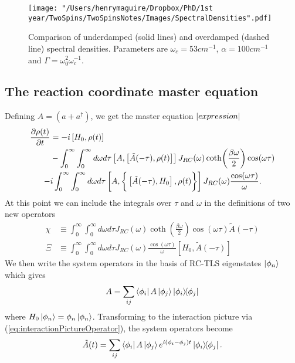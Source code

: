 \documentclass[]{article}
\begin{document}
\begin{figure}
	\texttt{[image: "/Users/henrymaguire/Dropbox/PhD/1st year/TwoSpins/TwoSpinsNotes/Images/SpectralDensities".pdf]}
	\caption{Comparison of underdamped (solid lines) and overdamped (dashed line) spectral densities. Parameters are $\omega_c=53cm^{-1}$, $\alpha=100cm^{-1}$ and $\Gamma=\omega_0^2\omega_c^{-1}$.}
\end{figure}
\subsection{The reaction coordinate master equation}
Defining $A= (a + a^{\dagger})$, we get the master equation $\abs{expression}$
\begin{align}
	\begin{split}
		\label{eq:ReactionMasterExpansion4}
		\pdv{\rho(t)}{t} &= -i\left[H_0, \rho(t)\right]\\
		&-\int_{0}^{\infty}\int_{0}^{\infty}d\omega d\tau 
		\left[A,\left[\tilde{A}(-\tau),\rho(t) \right]\right] J_{RC}(\omega) \coth(\frac{\beta \omega}{2})\cos(\omega \tau)\\ 
		-& i\int_{0}^{\infty}\int_{0}^{\infty}d\omega d\tau\left[A ,\biggr\lbrace\left[\tilde{A}(-\tau),H_0\right],\rho(t) \biggr\rbrace \right] J_{RC}(\omega) \frac{\cos(\omega \tau)}{\omega}.
	\end{split}
\end{align}
At this point we can include the integrals over $\tau$ and $\omega$ in the definitions of two new operators
\begin{align}
	\label{eq:NewRCOperators}
	\chi &\equiv \int_{0}^{\infty}\int_{0}^{\infty}d\omega d\tau  J_{RC}(\omega) \coth(\frac{\beta \omega}{2})\cos(\omega \tau) \tilde{A}(-\tau)\\
	\Xi &\equiv \int_{0}^{\infty}\int_{0}^{\infty}d\omega d\tau  J_{RC}(\omega) \frac{\cos(\omega\tau)}{\omega} \left[H_0, \tilde{A}(-\tau)\right]
\end{align}
We then write the system operators in the basis of RC-TLS eigenstates $\ket{\phi_n}$ which gives
\begin{equation}
A = \sum_{ij}\bra{\phi_i}A\ket{\phi_j} \dyad{\phi_i}{\phi_j}
\end{equation}
where $H_0\ket{\phi_n} = \phi_n\ket{\phi_n}$. Transforming to the interaction picture via (\ref{eq:interactionPictureOperator}), the system operators become
\begin{equation}
\tilde{A}(t) = \sum_{ij}\bra{\phi_i}A\ket{\phi_j} e^{i(\phi_i-\phi_j)t}\dyad{\phi_i}{\phi_j}.
\end{equation}
\end{document}
